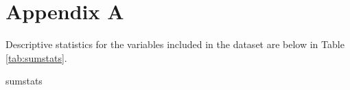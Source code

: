 \documentclass[class=article, crop=false]{standalone}
\begin{document}
\section{Appendix A}
\label{sec:appendixA}
Descriptive statistics for the variables included in the dataset are below in Table \ref{tab:sumstats}.

{sumstats}
\doublespacing

\ifstandalone

\fi
\end{document}
